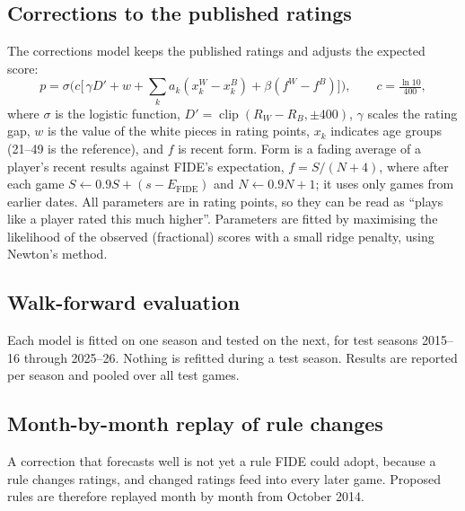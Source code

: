 \documentclass[11pt]{article}
\newcommand{\clip}{\operatorname{clip}}
\begin{document}
\subsection{Corrections to the published ratings}

The corrections model keeps the published ratings and adjusts the expected score:
\begin{equation}
p = \sigma\!\Big(c\big[\,\gamma D' + w + \textstyle\sum_k a_k (x^W_k - x^B_k) + \beta (f^W - f^B)\big]\Big),
\qquad c = \tfrac{\ln 10}{400},
\label{eq:model}
\end{equation}
where $\sigma$ is the logistic function, $D' = \clip(R_W - R_B, \pm 400)$, $\gamma$ scales the rating gap, $w$ is the value of the white pieces in rating points, $x_k$ indicates age groups (21--49 is the reference), and $f$ is recent form. Form is a fading average of a player's recent results against FIDE's expectation, $f = S/(N+4)$, where after each game $S \leftarrow 0.9S + (s - E_{\mathrm{FIDE}})$ and $N \leftarrow 0.9N + 1$; it uses only games from earlier dates. All parameters are in rating points, so they can be read as ``plays like a player rated this much higher''. Parameters are fitted by maximising the likelihood of the observed (fractional) scores with a small ridge penalty, using Newton's method.

\subsection{Walk-forward evaluation}

Each model is fitted on one season and tested on the next, for test seasons 2015--16 through 2025--26. Nothing is refitted during a test season. Results are reported per season and pooled over all \NTestGames{} test games.

\subsection{Month-by-month replay of rule changes}

A correction that forecasts well is not yet a rule FIDE could adopt, because a rule changes ratings, and changed ratings feed into every later game. Proposed rules are therefore replayed month by month from October 2014.
\end{document}
